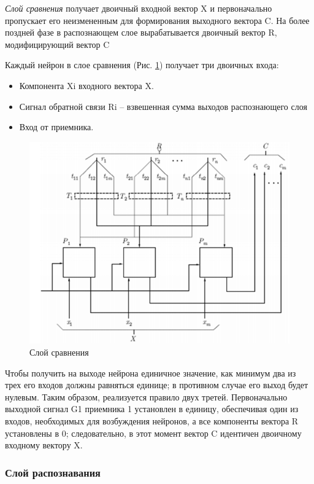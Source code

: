 \documentclass[14pt,a4paper,report]{article}
\begin{document}
\textit{Слой сравнения} получает двоичный входной вектор X и первоначально пропускает его неизмененным для формирования выходного вектора C. На более поздней фазе в распознающем слое вырабатывается двоичный вектор R, модифицирующий вектор C \cite{cite-kgeu-adapt}

Каждый нейрон в слое сравнения (Рис. \ref{art-compare}) получает три двоичных входа:

\begin{itemize}
	\item Компонента Xi входного вектора X.
	\item Сигнал обратной связи Ri -- взвешенная сумма выходов распознающего слоя
	\item Вход от приемника.
\end{itemize}

\begin{figure}[h!]
	\centering
	\includegraphics[scale = 0.90]{images/4.png}
	\caption{Слой сравнения}
	\label{art-compare}
\end{figure}

Чтобы получить на выходе нейрона единичное значение, как минимум два из трех его входов должны равняться единице; в противном случае его выход будет нулевым. Таким образом, реализуется правило двух третей. Первоначально выходной сигнал G1 приемника 1 установлен в единицу, обеспечивая один из входов, необходимых для возбуждения нейронов, а все компоненты вектора R установлены в 0; следовательно, в этот момент вектор C идентичен двоичному входному вектору X. 

\subsubsection{Слой распознавания}
\end{document}
